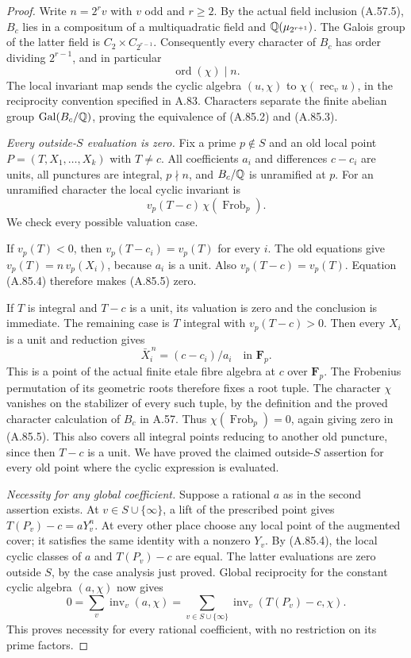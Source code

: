 \begin{proof}
Write $n=2^r v$ with $v$ odd and $r\ge2$.
By the actual field inclusion (A.57.5),
$B_c$ lies in a compositum of a multiquadratic field and
$\mathbb Q(\mu_{2^{r+1}})$.
The Galois group of the latter field is
$C_2\times C_{2^{r-1}}$.
Consequently every character of $B_c$ has order dividing
$2^{r-1}$, and in particular
\[
                              \operatorname{ord}(\chi)\mid n.
 \tag{A.85.4}
\]
The local invariant map sends the cyclic algebra
$(u,\chi)$ to $\chi(\operatorname{rec}_v u)$, in the
reciprocity convention specified in A.83.
Characters separate the finite abelian group
$\operatorname{Gal}(B_c/\mathbb Q)$, proving the equivalence of
(A.85.2) and (A.85.3).

\emph{Every outside-$S$ evaluation is zero.}
Fix a prime $p\notin S$ and an old local point
$P=(T,X_1,\ldots,X_k)$ with $T\ne c$.
All coefficients $a_i$ and differences $c-c_i$ are units,
all punctures are integral, $p\nmid n$, and $B_c/\mathbb Q$
is unramified at $p$.
For an unramified character the local cyclic invariant is
\[
              v_p(T-c)\,\chi(\operatorname{Frob}_p).
 \tag{A.85.5}
\]
We check every possible valuation case.

If $v_p(T)<0$, then
$v_p(T-c_i)=v_p(T)$ for every $i$.
The old equations give
$v_p(T)=n\,v_p(X_i)$, because $a_i$ is a unit.
Also $v_p(T-c)=v_p(T)$.
Equation (A.85.4) therefore makes (A.85.5) zero.

If $T$ is integral and $T-c$ is a unit, its valuation
is zero and the conclusion is immediate.
The remaining case is $T$ integral with $v_p(T-c)>0$.
Then every $X_i$ is a unit and reduction gives
\[
                 \bar X_i^{\,n}=(c-c_i)/a_i
                                         \quad\text{in }\mathbf F_p.
 \tag{A.85.6}
\]
This is a point of the actual finite etale fibre algebra
at $c$ over $\mathbf F_p$.
The Frobenius permutation of its geometric roots therefore
fixes a root tuple.
The character $\chi$ vanishes on the stabilizer of every
such tuple, by the definition and the proved character
calculation of $B_c$ in A.57.
Thus $\chi(\operatorname{Frob}_p)=0$, again giving zero in
(A.85.5).
This also covers all integral points reducing to another
old puncture, since then $T-c$ is a unit.
We have proved the claimed outside-$S$ assertion for every
old point where the cyclic expression is evaluated.

\emph{Necessity for any global coefficient.}
Suppose a rational $a$ as in the second assertion exists.
At $v\in S\cup\{\infty\}$, a lift of the prescribed point
gives
$T(P_v)-c=aY_v^n$.
At every other place choose any local point of the
augmented cover; it satisfies the same identity with a
nonzero $Y_v$.
By (A.85.4), the local cyclic classes of $a$ and
$T(P_v)-c$ are equal.
The latter evaluations are zero outside $S$, by the case
analysis just proved.
Global reciprocity for the constant cyclic algebra
$(a,\chi)$ now gives
\[
 0=\sum_v\operatorname{inv}_v(a,\chi)
   =\sum_{v\in S\cup\{\infty\}}
             \operatorname{inv}_v(T(P_v)-c,\chi).
 \tag{A.85.7}
\]
This proves necessity for every rational coefficient,
with no restriction on its prime factors.


\end{proof}
